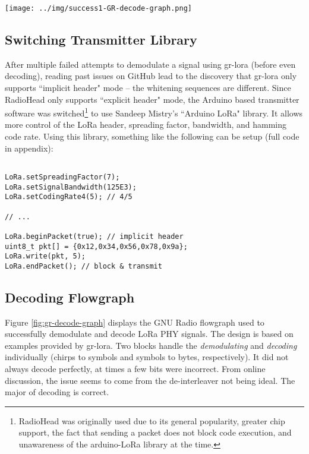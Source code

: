 \documentclass[conference, compsoc]{IEEEtran}
\begin{document}
\begin{figure*}[]
\begin{center}
\texttt{[image: ../img/success1-GR-decode-graph.png]}
\caption{Flowgraph used to decode LoRa signals. The `variable' blocks are used to match signal parameters.}
\label{fig:gr-decode-graph}
\end{center}
\end{figure*}

\subsection{Switching Transmitter Library}
After multiple failed attempts to demodulate a signal using gr-lora (before even decoding), reading past issues on GitHub lead to the discovery that gr-lora only supports ``implicit header" mode -- the whitening sequences are different. Since RadioHead only supports ``explicit header" mode, the Arduino based transmitter software was switched\footnote{RadioHead was originally used due to its general popularity, greater chip support, the fact that sending a packet does not block code execution, and unawareness of the arduino-LoRa library at the time.} to use Sandeep Mistry's ``Arduino LoRa" library\cite{sandeep}. It allows more control of the LoRa header, spreading factor, bandwidth, and hamming code rate. Using this library, something like the following can be setup (full code in appendix):

\begin{Verbatim}

LoRa.setSpreadingFactor(7);
LoRa.setSignalBandwidth(125E3);
LoRa.setCodingRate4(5); // 4/5

// ...

LoRa.beginPacket(true); // implicit header
uint8_t pkt[] = {0x12,0x34,0x56,0x78,0x9a};
LoRa.write(pkt, 5);
LoRa.endPacket(); // block & transmit
\end{Verbatim}


\subsection{Decoding Flowgraph}
Figure \ref{fig:gr-decode-graph} displays the GNU Radio flowgraph used to successfully demodulate and decode LoRa PHY signals. The design is based on examples provided by gr-lora. Two blocks handle the \textit{demodulating} and \textit{decoding} individually (chirps to symbols and symbols to bytes, respectively). It did not always decode perfectly, at times a few bits were incorrect. From online discussion, the issue seems to come from the de-interleaver not being ideal. The major of decoding is correct.
\end{document}
